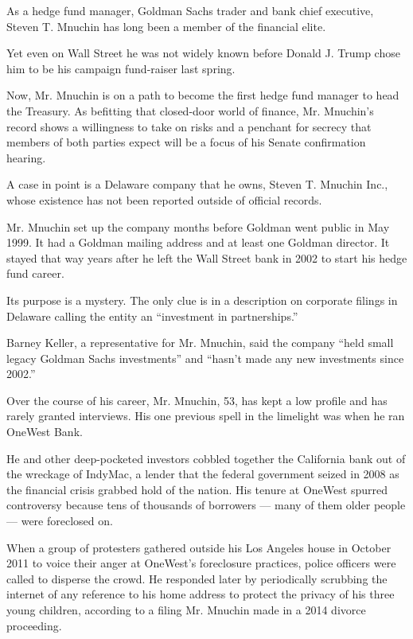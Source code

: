 As a hedge fund manager, Goldman Sachs trader and bank chief executive,
Steven T. Mnuchin has long been a member of the financial elite.

Yet even on Wall Street he was not widely known before Donald J. Trump
chose him to be his campaign fund-raiser last spring.

Now, Mr. Mnuchin is on a path to become the first hedge fund manager to
head the Treasury. As befitting that closed-door world of finance, Mr.
Mnuchin's record shows a willingness to take on risks and a penchant for
secrecy that members of both parties expect will be a focus of his
Senate confirmation hearing.

A case in point is a Delaware company that he owns, Steven T. Mnuchin
Inc., whose existence has not been reported outside of official records.

Mr. Mnuchin set up the company months before Goldman went public in May
1999. It had a Goldman mailing address and at least one Goldman
director. It stayed that way years after he left the Wall Street bank in
2002 to start his hedge fund career.

Its purpose is a mystery. The only clue is in a description on corporate
filings in Delaware calling the entity an ``investment in
partnerships.''

Barney Keller, a representative for Mr. Mnuchin, said the company ``held
small legacy Goldman Sachs investments'' and ``hasn't made any new
investments since 2002.''

Over the course of his career, Mr. Mnuchin, 53, has kept a low profile
and has rarely granted interviews. His one previous spell in the
limelight was when he ran OneWest Bank.

He and other deep-pocketed investors cobbled together the California
bank out of the wreckage of IndyMac, a lender that the federal
government seized in 2008 as the financial crisis grabbed hold of the
nation. His tenure at OneWest spurred controversy because tens of
thousands of borrowers --- many of them older people --- were foreclosed
on.

When a group of protesters gathered outside his Los Angeles house in
October 2011 to voice their anger at OneWest's foreclosure practices,
police officers were called to disperse the crowd. He responded later by
periodically scrubbing the internet of any reference to his home address
to protect the privacy of his three young children, according to a
filing Mr. Mnuchin made in a 2014 divorce proceeding.

